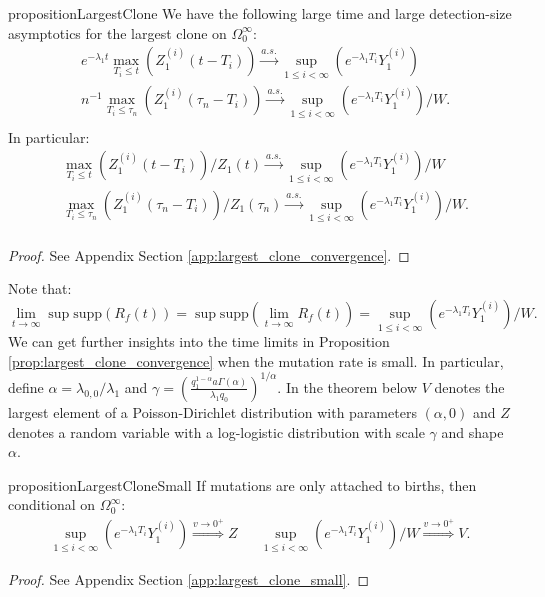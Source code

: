 \documentclass{article}
\numberwithin{equation}{section}
\begin{document}
\begin{restatable}{proposition}{LargestClone}
  We have the following large time and large detection-size asymptotics for the largest clone on $\Omega_0^\infty$:
  \begin{align*}
    &e^{-\lambda_1 t}\max_{T_i\leq t}\left(Z_1^{(i)}(t-T_i)\right)\overset{a.s.}{\to}\sup_{1\leq i<\infty}\left(e^{-\lambda_1 T_i}Y_1^{(i)}\right)\\
    &n^{-1}\max_{T_i\leq \tau_n}\left(Z_1^{(i)}(\tau_n-T_i)\right)\overset{a.s.}{\to}\sup_{1\leq i<\infty}\left(e^{-\lambda_1 T_i}Y_1^{(i)}\right)/W.\\
  \end{align*}
    In particular:
    \begin{align*}
    &\max_{T_i\leq t}\left(Z_1^{(i)}(t-T_i)\right)/Z_1(t)\overset{a.s.}{\to}\sup_{1\leq i<\infty}\left(e^{-\lambda_1 T_i}Y_1^{(i)}\right)/W\\
    &\max_{T_i\leq \tau_n}\left(Z_1^{(i)}(\tau_n-T_i)\right)/Z_1(\tau_n)\overset{a.s.}{\to}\sup_{1\leq i<\infty}\left(e^{-\lambda_1 T_i}Y_1^{(i)}\right)/W.\\
  \end{align*}\label{prop:largest_clone_convergence}
\end{restatable}
\begin{proof}
  See Appendix Section \ref{app:largest_clone_convergence}.
\end{proof}
Note that:
\[\lim_{t\to\infty}\sup\text{supp}(R_f(t))=\sup\text{supp}(\lim_{t\to\infty}R_f(t))=\sup_{1\leq i<\infty}\left(e^{-\lambda_1 T_i}Y_1^{(i)}\right)/W.\]
We can get further insights into the time limits in Proposition \ref{prop:largest_clone_convergence} when the mutation rate is small. In particular, define $\alpha=\lambda_{0,0}/\lambda_1$ and $\gamma=\left(\frac{q_1^{1-\alpha}a\Gamma(\alpha)}{\lambda_1 q_0}\right)^{1/\alpha}.$ In the theorem below $V$ denotes the largest element of a Poisson-Dirichlet distribution with parameters $(\alpha,0)$ and $Z$ denotes a random variable with a log-logistic distribution with scale $\gamma$ and shape $\alpha$.
\begin{restatable}{proposition}{LargestCloneSmall}
 If mutations are only attached to births, then conditional on $\Omega_0^\infty$:
  \begin{align*}
    \sup_{1\leq i<\infty}\left(e^{-\lambda_1 T_i}Y_1^{(i)}\right)\overset{v\to 0^+}{\Rightarrow}Z& & \sup_{1\leq i<\infty}\left(e^{-\lambda_1 T_i}Y_1^{(i)}\right)/W\overset{v\to 0^+}{\Rightarrow}V.
  \end{align*}
  \label{prop:largest_clone_small}
\end{restatable}
\begin{proof}
  See Appendix Section \ref{app:largest_clone_small}.
\end{proof}
\end{document}
